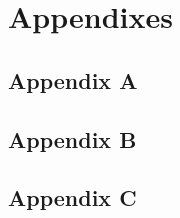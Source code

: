 \section{Appendixes}

\subsection{Appendix A}
\label{app:A}

\pagebreak

\subsection{Appendix B}
\label{app:B}

\pagebreak

\subsection{Appendix C}
\label{app:C}

\pagebreak